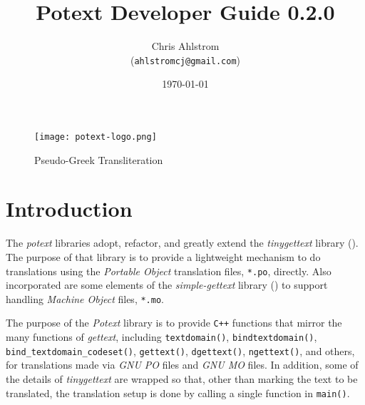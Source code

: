 \documentclass[
 11pt,
 twoside,
 a4paper,
 final                                 %
]{article}
\begin{document}
\title{Potext Developer Guide 0.2.0}
\author{Chris Ahlstrom \\
   (\texttt{ahlstromcj@gmail.com})}
\date{\today}
\maketitle

\begin{figure}[H]
   \centering 
   \texttt{[image: potext-logo.png]}
   \caption*{Pseudo-Greek Transliteration}
\end{figure}

\clearpage                             %

\tableofcontents
\listoffigures                         %

%

\parindent 0pt
\parskip 9pt

\rhead{\rightmark}         %

\section{Introduction}
\label{sec:introduction}

   The \textsl{potext} libraries adopt, refactor, and greatly extend the
   \textsl{tinygettext} library (\cite{tinygettext}).
   The purpose of that library is to provide a lightweight mechanism
   to do translations using the
   \textsl{Portable Object} translation files, \texttt{*.po}, directly.
   Also incorporated are some elements of the
   \textsl{simple-gettext} library (\cite{simplegettext})
   to support handling \textsl{Machine Object} files, \texttt{*.mo}.

   The purpose of the \textsl{Potext} library is to provide \texttt{C++}
   functions that mirror the many functions of \textsl{gettext},
   including 
   \texttt{textdomain()},
   \texttt{bindtextdomain()},
   \texttt{bind\_textdomain\_codeset()},
   \texttt{gettext()},
   \texttt{dgettext()},
   \texttt{ngettext()},
   and others, for translations made via
   \textsl{GNU PO} files and
   \textsl{GNU MO} files.
   In addition, some of the details of \textsl{tinygettext} 
   are wrapped so that, other than marking the text to be translated,
   the translation setup is done by calling a single function in
   \texttt{main()}.
\end{document}

